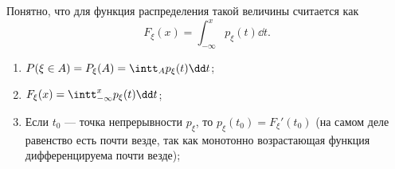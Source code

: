 Понятно, что для функция распределения такой величины считается как 
     $$F_\xi (x) = \int_{-\infty}^x p_\xi (t) \dd t.$$

 \begin{properties}
 \enewline
     \begin{enumerate}
         \item $P(\xi\in A) = P_\xi(A) = \intt_A p_\xi (t) \dd t$;
         \item $F_\xi(x) = \intt_{-\infty}^x p_\xi(t) \dd t$;
         \item Если $t_0$ --- точка непрерывности $p_\xi$, то
               $p_\xi(t_0) = F_\xi'(t_0)$ (на самом деле равенство есть почти везде, так как монотонно возрастающая функция дифференцируема почти везде);
     \end{enumerate}
 \end{properties}


